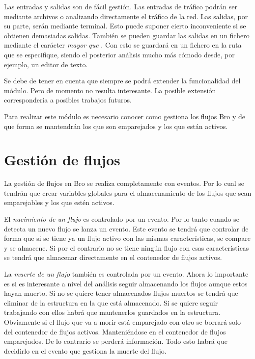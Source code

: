 \intro Las entradas y salidas son de fácil gestión. Las entradas de tráfico podrán ser mediante archivos o 
analizando directamente el tráfico de la red. Las salidas, por su parte, serán mediante terminal. Esto puede 
suponer cierto inconveniente si se obtienen demasiadas salidas. También se pueden guardar las salidas en un 
fichero mediante el carácter \textit{mayor que} . Con esto se guardará en un fichero en la ruta que se especifique, siendo el 
posterior análisis mucho más cómodo desde, por ejemplo, un editor de texto.

\intro Se debe de tener en cuenta que siempre se podrá extender la funcionalidad del módulo. Pero de momento no 
resulta interesante. La posible extensión correspondería a posibles trabajos futuros.

\intro Para realizar este módulo es necesario conocer como gestiona los flujos Bro y de que forma se mantendrán 
los que son emparejados y los que están activos.

\section{Gestión de flujos}

La gestión de flujos en Bro se realiza completamente con eventos. Por lo cual se tendrán que crear variables 
globales para el almacenamiento de los flujos que sean emparejables y los que estén activos.

\intro El \textit{nacimiento de un flujo} es controlado por un evento. Por lo tanto cuando se detecta un nuevo 
flujo se lanza un evento. Este evento se tendrá que controlar de forma que si se tiene ya un flujo activo con las 
mismas características, se compare y se almacene. Si por el contrario no se tiene ningún flujo con esas 
características se tendrá que almacenar directamente en el contenedor de flujos activos.

\intro La \textit{muerte de un flujo} también es controlada por un evento. Ahora lo importante es si es interesante 
a nivel del análisis seguir almacenando los flujos aunque estos hayan muerto. Si no se quiere tener almacenados 
flujos muertos se tendrá que eliminar de la estructura en la que está almacenado. Si se quiere seguir trabajando 
con ellos habrá que mantenerlos guardados en la estructura. Obviamente si el flujo que va a morir está emparejado 
con otro se borrará solo del contenedor de flujos activos. Manteniéndose en el contenedor de flujos emparejados. De 
lo contrario se perderá información. Todo esto habrá que decidirlo en el evento que gestiona la muerte del flujo.

